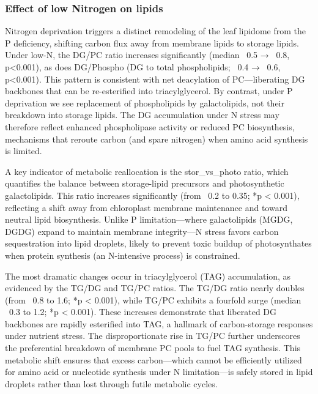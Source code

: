 \documentclass[10pt,letterpaper]{article}
\begin{document}
\subsubsection*{Effect of low Nitrogen on lipids}
Nitrogen deprivation triggers a distinct remodeling of the leaf lipidome from the P deficiency, shifting carbon flux away from membrane lipids to storage lipids. Under low-N, the DG/PC ratio increases significantly (median ~0.5 → ~0.8, p<0.001), as does DG/Phospho (DG to total phospholipids; ~0.4 → ~0.6, p<0.001). This pattern is consistent with net deacylation of PC—liberating DG backbones that can be re-esterified into triacylglycerol. By contrast, under P deprivation we see replacement of phospholipids by galactolipids, not their breakdown into storage lipids. The DG accumulation under N stress may therefore reflect enhanced phospholipase activity or reduced PC biosynthesis, mechanisms that reroute carbon (and spare nitrogen) when amino acid synthesis is limited.

A key indicator of metabolic reallocation is the stor_vs_photo ratio, which quantifies the balance between storage-lipid precursors and photosynthetic galactolipids. This ratio increases significantly (from ~0.2 to 0.35; *p < 0.001), reflecting a shift away from chloroplast membrane maintenance and toward neutral lipid biosynthesis. Unlike P limitation—where galactolipids (MGDG, DGDG) expand to maintain membrane integrity—N stress favors carbon sequestration into lipid droplets, likely to prevent toxic buildup of photosynthates when protein synthesis (an N-intensive process) is constrained.

The most dramatic changes occur in triacylglycerol (TAG) accumulation, as evidenced by the TG/DG and TG/PC ratios. The TG/DG ratio nearly doubles (from ~0.8 to 1.6; *p < 0.001), while TG/PC exhibits a fourfold surge (median ~0.3 to 1.2; *p < 0.001). These increases demonstrate that liberated DG backbones are rapidly esterified into TAG, a hallmark of carbon-storage responses under nutrient stress. The disproportionate rise in TG/PC further underscores the preferential breakdown of membrane PC pools to fuel TAG synthesis. This metabolic shift ensures that excess carbon—which cannot be efficiently utilized for amino acid or nucleotide synthesis under N limitation—is safely stored in lipid droplets rather than lost through futile metabolic cycles.
\end{document}
